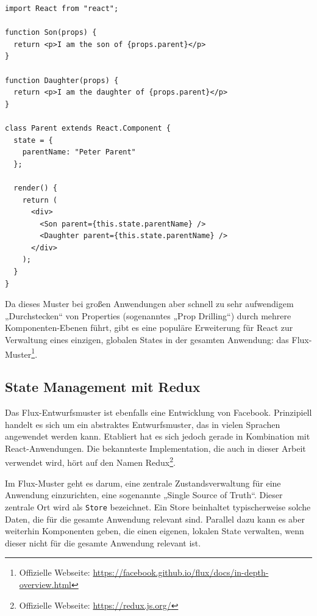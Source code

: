 \begin{minipage}{\linewidth}
\begin{lstlisting}[caption={„Lifting state up“: Mehrere Komponenten greifen auf die gleichen Daten zu.}]
import React from "react";

function Son(props) {
  return <p>I am the son of {props.parent}</p>
}

function Daughter(props) {
  return <p>I am the daughter of {props.parent}</p>
}

class Parent extends React.Component {
  state = {
    parentName: "Peter Parent"
  };

  render() {
    return (
      <div>
        <Son parent={this.state.parentName} />
        <Daughter parent={this.state.parentName} />
      </div>
    );
  }
}
\end{lstlisting}
\end{minipage}

Da dieses Muster bei großen Anwendungen aber schnell zu sehr aufwendigem „Durchstecken“ von Properties (sogenanntes „Prop Drilling“) durch mehrere Komponenten-Ebenen führt, gibt es eine populäre Erweiterung für React zur Verwaltung eines einzigen, globalen States in der gesamten Anwendung: das Flux-Muster\footnote{Offizielle Webseite:  \url{https://facebook.github.io/flux/docs/in-depth-overview.html}}.


\subsection{State Management mit Redux}
\label{chap:redux_state_management}
Das Flux-Entwurfsmuster ist ebenfalls eine Entwicklung von Facebook. Prinzipiell handelt es sich um ein abstraktes Entwurfsmuster, das in vielen Sprachen angewendet werden kann. Etabliert hat es sich jedoch gerade in Kombination mit React-Anwendungen. Die bekannteste Implementation, die auch in dieser Arbeit verwendet wird, hört auf den Namen Redux\footnote{Offizielle Webseite: \url{https://redux.js.org/}}.

Im Flux-Muster geht es darum, eine zentrale Zustandsverwaltung für eine Anwendung einzurichten, eine sogenannte „Single Source of Truth“. Dieser zentrale Ort wird als \texttt{Store} bezeichnet. Ein Store beinhaltet typischerweise solche Daten, die für die gesamte Anwendung relevant sind. Parallel dazu kann es aber weiterhin Komponenten geben, die einen eigenen, lokalen State verwalten, wenn dieser nicht für die gesamte Anwendung relevant ist.

